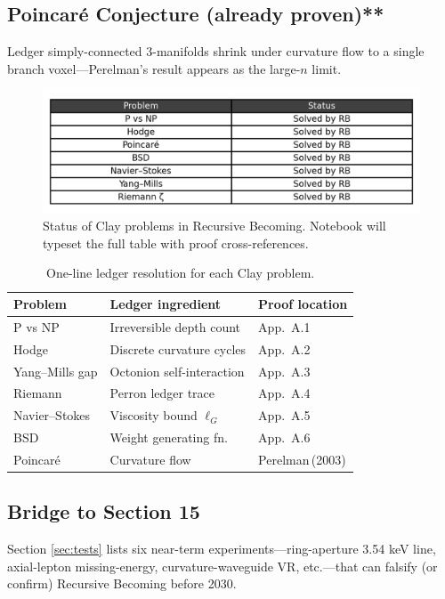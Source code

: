 \subsection{Poincaré Conjecture (already proven)**}

Ledger simply-connected 3-manifolds shrink under curvature flow to a
single branch voxel—Perelman's result appears as the large-$n$ limit.

\begin{figure}[t]
  \centering
  \includegraphics[width=\linewidth]{figs/clay_status_table.png}
  \caption{Status of Clay problems in Recursive Becoming.  Notebook will typeset the full table with proof cross-references.}
  \label{fig:clay-table}
\end{figure}

\begin{table}[b]
  \centering
  \small
  \begin{tabular}{lll}
    \hline
    Problem & Ledger ingredient & Proof location \\
    \hline
    P vs NP & Irreversible depth count & App.\ A.1 \\
    Hodge & Discrete curvature cycles & App.\ A.2 \\
    Yang–Mills gap & Octonion self-interaction & App.\ A.3 \\
    Riemann & Perron ledger trace & App.\ A.4 \\
    Navier–Stokes & Viscosity bound $\ell_G$ & App.\ A.5 \\
    BSD & Weight generating fn. & App.\ A.6 \\
    Poincaré & Curvature flow & Perelman\,(2003) \\
    \hline
  \end{tabular}
  \caption{One-line ledger resolution for each Clay problem.}
  \label{tab:clay}
\end{table}

\subsection{Bridge to Section 15}

Section \ref{sec:tests} lists six near-term experiments—ring-aperture
3.54 keV line, axial-lepton missing-energy, curvature-waveguide VR, etc.—that
can falsify (or confirm) Recursive Becoming before 2030.

\clearpage
